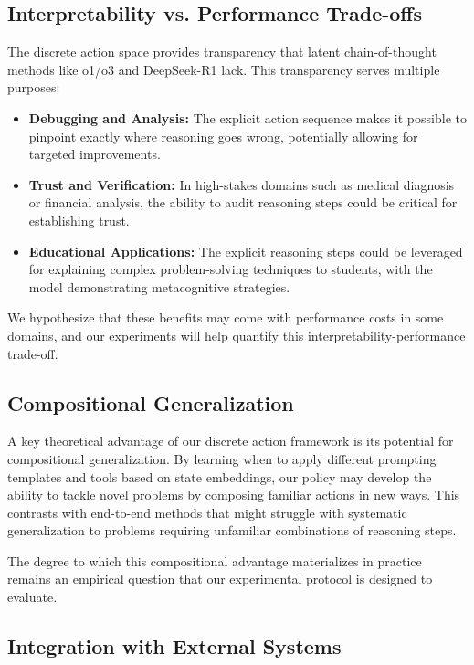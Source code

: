 \documentclass[10pt,journal,compsoc]{IEEEtran}
\begin{document}
\subsection{Interpretability vs. Performance Trade-offs}

The discrete action space provides transparency that latent chain-of-thought methods like o1/o3 and DeepSeek-R1 lack. This transparency serves multiple purposes:

\begin{itemize}
\item \textbf{Debugging and Analysis:} The explicit action sequence makes it possible to pinpoint exactly where reasoning goes wrong, potentially allowing for targeted improvements.

\item \textbf{Trust and Verification:} In high-stakes domains such as medical diagnosis or financial analysis, the ability to audit reasoning steps could be critical for establishing trust.

\item \textbf{Educational Applications:} The explicit reasoning steps could be leveraged for explaining complex problem-solving techniques to students, with the model demonstrating metacognitive strategies.
\end{itemize}

We hypothesize that these benefits may come with performance costs in some domains, and our experiments will help quantify this interpretability-performance trade-off.

\subsection{Compositional Generalization}

A key theoretical advantage of our discrete action framework is its potential for compositional generalization. By learning when to apply different prompting templates and tools based on state embeddings, our policy may develop the ability to tackle novel problems by composing familiar actions in new ways. This contrasts with end-to-end methods that might struggle with systematic generalization to problems requiring unfamiliar combinations of reasoning steps.

The degree to which this compositional advantage materializes in practice remains an empirical question that our experimental protocol is designed to evaluate.

\subsection{Integration with External Systems}
\end{document}
